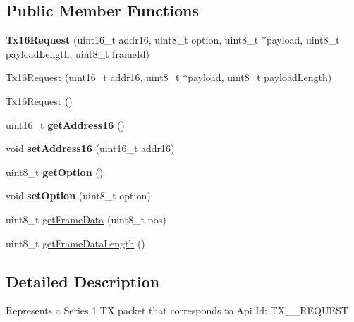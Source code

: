 \subsection*{\-Public \-Member \-Functions}
\begin{DoxyCompactItemize}
\item 
\hypertarget{classTx16Request_a4e8f8b660e4837f4053e9f18d394f913}{{\bfseries \-Tx16\-Request} (uint16\-\_\-t addr16, uint8\-\_\-t option, uint8\-\_\-t $\ast$payload, uint8\-\_\-t payload\-Length, uint8\-\_\-t frame\-Id)}\label{classTx16Request_a4e8f8b660e4837f4053e9f18d394f913}

\item 
\hyperlink{classTx16Request_a760e2c31996673e816fb3576748f731f}{\-Tx16\-Request} (uint16\-\_\-t addr16, uint8\-\_\-t $\ast$payload, uint8\-\_\-t payload\-Length)
\item 
\hyperlink{classTx16Request_adcdbb644e08788267fb86cbefde76b1b}{\-Tx16\-Request} ()
\item 
\hypertarget{classTx16Request_adeb9cf2989e2c86992f6a652a92bd648}{uint16\-\_\-t {\bfseries get\-Address16} ()}\label{classTx16Request_adeb9cf2989e2c86992f6a652a92bd648}

\item 
\hypertarget{classTx16Request_ac28c597252a64d47df3bb61dd8251ee4}{void {\bfseries set\-Address16} (uint16\-\_\-t addr16)}\label{classTx16Request_ac28c597252a64d47df3bb61dd8251ee4}

\item 
\hypertarget{classTx16Request_a448d4a28812d6cc67a7c45138ba6061c}{uint8\-\_\-t {\bfseries get\-Option} ()}\label{classTx16Request_a448d4a28812d6cc67a7c45138ba6061c}

\item 
\hypertarget{classTx16Request_afc0792e586ddb3c9d62efb787a5956d9}{void {\bfseries set\-Option} (uint8\-\_\-t option)}\label{classTx16Request_afc0792e586ddb3c9d62efb787a5956d9}

\item 
uint8\-\_\-t \hyperlink{classTx16Request_af5ffbc2164e766d96f54c723996fd389}{get\-Frame\-Data} (uint8\-\_\-t pos)
\item 
uint8\-\_\-t \hyperlink{classTx16Request_a9a1ddfb380e72ecc09a024c6de6cdf8e}{get\-Frame\-Data\-Length} ()
\end{DoxyCompactItemize}


\subsection{\-Detailed \-Description}
\-Represents a \-Series 1 \-T\-X packet that corresponds to \-Api \-Id\-: \-T\-X\-\_\-\_\-\-R\-E\-Q\-U\-E\-S\-T 

